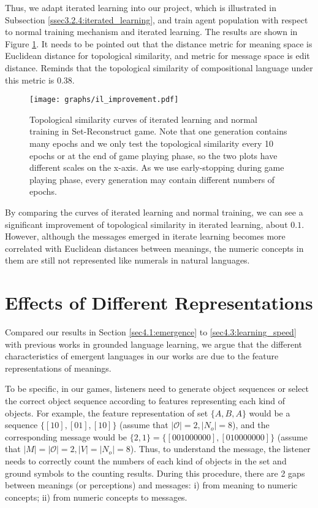Thus, we adapt iterated learning into our project, which is illustrated in Subsection \ref{ssec3.2.4:iterated_learning}, and train agent population with respect to normal training mechanism and iterated learning. The results are shown in Figure \ref{fig4.4:il_improve}. It needs to be pointed out that the distance metric for meaning space is Euclidean distance for topological similarity, and metric for message space is edit distance. Reminds that the topological similarity of compositional language under this metric is 0.38.

\begin{figure}[!h]
    \centering
    \texttt{[image: graphs/il\_improvement.pdf]}
    \caption{Topological similarity curves of iterated learning and normal training in Set-Reconstruct game. Note that one generation contains many epochs and we only test the topological similarity every 10 epochs or at the end of game playing phase, so the two plots have different scales on the x-axis. As we use early-stopping during game playing phase, every generation may contain different numbers of epochs.}
    \label{fig4.4:il_improve}
\end{figure}

By comparing the curves of iterated learning and normal training, we can see a significant improvement of topological similarity in iterated learning, about $0.1$. However, although the messages emerged in iterate learning becomes more correlated with Euclidean distances between meanings, the numeric concepts in them are still not represented like numerals in natural languages.


\section{Effects of Different Representations}
\label{sec4.4:represent_effect}

Compared our results in Section \ref{sec4.1:emergence} to \ref{sec4.3:learning_speed} with previous works in grounded language learning, we argue that the different characteristics of emergent languages in our works are due to the feature representations of meanings.

To be specific, in our games, listeners need to generate object sequences or select the correct object sequence according to features representing each kind of objects. For example, the feature representation of set $\{A, B, A\}$ would be a sequence $\{[1 0], [0 1], [1 0]\}$ (assume that $|\mathcal{O}|=2, |N_o|=8$), and the corresponding message would be $\{2, 1\}=\{[0 0 1 0 0 0 0 0 0], [0 1 0 0 0 0 0 0 0]\}$ (assume that $|M|=|\mathcal{O}|=2, |V|=|N_o|=8$). Thus, to understand the message, the listener needs to correctly count the numbers of each kind of objects in the set and ground symbols to the counting results. During this procedure, there are 2 gaps between meanings (or perceptions) and messages: i) from meaning to numeric concepts; ii) from numeric concepts to messages.

